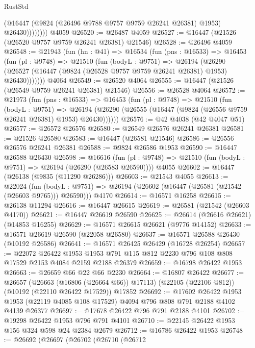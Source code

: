 \begin{lexlean}{RustStd}
\begin{coremodule}
                  (@16447 (@9824 (@26496 @9788 @9757 @9759 @26241 @26381) @1953) @26430))))))))
    @4059
@26520 := @26487 @4059
@26527 := @16447 (@21526 (@26520 @9757 @9759 @26241 @26381) @21546)
@26528 := @26496 @4059
@26548 := @21943
    (fun (hn : @41) =>
    @16534
      (fun (pns : @16533) =>
      @16453
        (fun (pl : @9748) =>
        @21510
          (fun (bodyL : @9751) =>
          @26194
            (@26290 (@26527 (@16447 (@9824 (@26528 @9757 @9759 @26241 @26381) @1953) @26430)))))))
    @4064
@26549 := @26520 @4064
@26555 := @16447 (@21526 (@26549 @9759 @26241 @26381) @21546)
@26556 := @26528 @4064
@26572 := @21973
    (fun (pns : @16533) =>
    @16453
      (fun (pl : @9748) =>
      @21510
        (fun (bodyL : @9751) =>
        @26194 (@26290 (@26555 (@16447 (@9824 (@26556 @9759 @26241 @26381) @1953) @26430))))))
@26576 := @42 @4038 (@42 @4047 @51)
@26577 := @26572 @26576
@26580 := @26549 @26576 @26241 @26381
@26581 := @21526 @26580
@26583 := @16447 (@26581 @21546)
@26586 := @26556 @26576 @26241 @26381
@26588 := @9824 @26586 @1953
@26590 := @16447 @26588 @26430
@26598 := @16616
    (fun (pl : @9748) => @21510 (fun (bodyL : @9751) => @26194 (@26290 (@26583 @26590))))
    @4055
@26602 := @16447 (@26138 (@9835 (@11290 @26286)))
@26603 := @21543 @4055
@26613 := @22024
    (fun (bodyL : @9751) => @26194 (@26602 (@16447 (@26581 (@21542 (@26603 @9765))) @26590)))
    @4170
@26614 := @16571 @16258
@26615 := @26138 @11294
@26616 := @16447 @26615
@26619 := @26581 (@21542 (@26603 @4170))
@26621 := @16447 @26619 @26590
@26625 := @26614 (@26616 @26621) (@14853 @16255)
@26629 := @16571 @26615 @26621 (@9776 @14152)
@26633 := @16571 @26619 @26590 (@22058 @26580)
@26637 := @16571 @26588 @26430 (@10192 @26586)
@26641 := @16571 @26425 @26429 (@16728 @26254)
@26657 := @22072
    @26422
    @1953
    @1953
    @791
    @115
    @812
    @2230
    @796
    @108
    @808
    @17529
    @2153
    @4084
    @2159
    @2188
    @26379
@26659 := @16798 @26422 @1953
@26663 := @26659 @66 @22 @66 @2230
@26664 := @16807 @26422
@26677 := @26657
    (@26663 (@16806 (@26664 @66)) @17113)
    (@22105 (@22106 @812))
    (@10192 (@22110 @26422 @17529))
    @17852
@26692 := @17602
    @26422
    @1953
    @1953
    (@22119 @4085 @108 @17529)
    @4094
    @796
    @808
    @791
    @2188
    @4102
    @4139
    @26377
@26697 := @17678 @26422 @796 @791 @2188 @4101
@26702 := @19298 @26422 @1953 @796 @791 @4101
@26710 := @22145 @26422 @1953 @156 @324 @598 @24 @2384 @2679
@26712 := @16786 @26422 @1953
@26748 := @26692
    (@26697
      (@26702
        (@26710
          (@26712

\end{coremodule}
\end{lexlean}
